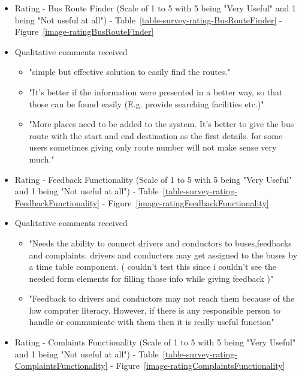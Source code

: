 \documentclass[12pt, oneside]{report}
\begin{document}
\begin {itemize}
\item Rating - Bus Route Finder (Scale of 1 to 5 with 5 being "Very Useful" and 1 being "Not useful at all") - Table~\ref{table-survey-rating-BusRouteFinder} - Figure~\ref{image-ratingBusRouteFinder}

\item Qualitative comments received
\begin {itemize}
\item "simple but effective solution to easily find the routes."
\item "It's better if the information were presented in a better way, so that those can be found easily (E.g. provide searching facilities etc.)"
\item "More places need to be added to the system. It's better to give the bus route with the start and end destination as the first details. for some users sometimes giving only route number will not make sense very much."
\end {itemize}

\item Rating - Feedback Functionality (Scale of 1 to 5 with 5 being "Very Useful" and 1 being "Not useful at all") - Table~\ref{table-survey-rating-FeedbackFunctionality} - Figure~\ref{image-ratingFeedbackFunctionality}

\item Qualitative comments received
\begin {itemize}
\item "Needs the ability to connect drivers and conductors to buses,feedbacks and complaints. drivers and conducters may get assigned to the buses by a time table component. ( couldn't test this since i couldn't see the needed form elements for filling those info while giving feedback )"
\item "Feedback to drivers and conductors may not reach them because of the low computer literacy. However, if there is any responsible person to handle or communicate with them then it is really useful function"
\end {itemize}

\item Rating - Comlaints Functionality (Scale of 1 to 5 with 5 being "Very Useful" and 1 being "Not useful at all") - Table~\ref{table-survey-rating-ComplaintsFunctionality} - Figure~\ref{image-ratingComplaintsFunctionality}


\end{itemize}
\end{document}
